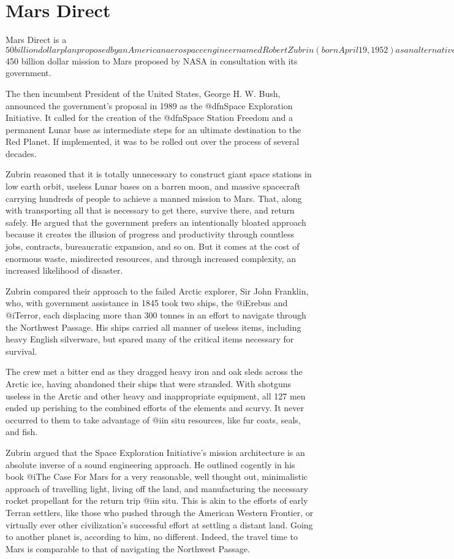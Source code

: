 \section{Mars Direct}
Mars Direct is a $50 billion dollar plan proposed by an American aerospace engineer named Robert Zubrin (born April 19, 1952) as an alternative to the prohibitively costly $450 billion dollar mission to Mars proposed by NASA in consultation with its government.

The then incumbent President of the United States, George H. W. Bush, announced the government's proposal in 1989 as the @dfn{Space Exploration Initiative}. It called for the creation of the @dfn{Space Station Freedom} and a permanent Lunar base as intermediate steps for an ultimate destination to the Red Planet. If implemented, it was to be rolled out over the process of several decades.

Zubrin reasoned that it is totally unnecessary to construct giant space stations in low earth orbit, useless Lunar bases on a barren moon, and massive spacecraft carrying hundreds of people to achieve a manned mission to Mars. That, along with transporting all that is necessary to get there, survive there, and return safely. He argued that the government prefers an intentionally bloated approach because it creates the illusion of progress and productivity through countless jobs, contracts, bureaucratic expansion, and so on. But it comes at the cost of enormous waste, misdirected resources, and through increased complexity, an increased likelihood of disaster.

Zubrin compared their approach to the failed Arctic explorer, Sir John Franklin, who, with government assistance in 1845 took two ships, the @i{Erebus} and @i{Terror}, each displacing more than 300 tonnes in an effort to navigate through the Northwest Passage. His ships carried all manner of useless items, including heavy English silverware, but spared many of the critical items necessary for survival. 

The crew met a bitter end as they dragged heavy iron and oak sleds across the Arctic ice, having abandoned their ships that were stranded. With shotguns useless in the Arctic and other heavy and inappropriate equipment, all 127 men ended up perishing to the combined efforts of the elements and scurvy. It never occurred to them to take advantage of @i{in situ} resources, like fur coats, seals, and fish.

Zubrin argued that the Space Exploration Initiative's mission architecture is an absolute inverse of a sound engineering approach. He outlined cogently in his book @i{The Case For Mars} for a very reasonable, well thought out, minimalistic approach of travelling light, living off the land, and manufacturing the necessary rocket propellant for the return trip @i{in situ}. This is akin to the efforts of early Terran settlers, like those who pushed through the American Western Frontier, or virtually ever other civilization's successful effort at settling a distant land. Going to another planet is, according to him, no different. Indeed, the travel time to Mars is comparable to that of navigating the Northwest Passage.

